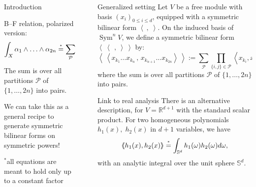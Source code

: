 \documentclass[final]{beamer}
\newlength{\sepwid}
\newlength{\onecolwid}
\DeclareMathOperator{\Sym}{Sym}
\newcommand{\coloneqq}{:=}
\newcommand{\bra}{\left<\!\!\!\:\left<}
\newcommand{\ket}{\right>\!\!\!\:\right>}
\newcommand{\myeq}[1]{\mathrel{\overset{\makebox[0pt]{\text{\tiny #1}}}{=}}}
\newcommand{\stareq}{\myeq{*}}
\newcommand{\R}{\mathbb{R}}
\renewcommand{\S}{\mathbb{S}}
\begin{document}
\begin{frame}[t]
\begin{columns}[t]
\begin{column}{\onecolwid}
\begin{block}{Introduction}
\begin{alertblock}{B--F relation, polarized version:}
$$
\int_X \alpha_1\wedge\ldots \wedge\alpha_{2n} \stareq\sum_{\mathcal{P}} \prod_{\{i,j\}\in\mathcal{P}} \left<\alpha_i,\alpha_j\right>.
$$
The sum is over all partitions $\mathcal{P}$ of $\{1,\ldots,2n\}$ into pairs.
\end{alertblock}
We can take this as a general recipe to generate symmetric bilinear forms on symmetric powers!
\vspace{55mm}
\begin{flushright}
${}^*$all equations are meant to hold only up to a constant factor
\end{flushright}
\end{block}






\end{column} %


\begin{column}{\sepwid}\end{column} %

\begin{column}{\onecolwid} %

\begin{block}{Generalized setting}
Let $V$ be a free module with basis $(x_i)_{0\leq i\leq d}$, equipped with a symmetric bilinear form $\left<\ ,\;\right>$.
On the induced basis of $\Sym^nV$, we define a symmetric bilinear form $\bra\ \,,\ \ket$ by: 
\begin{equation*}
\label{mydef}
\bra x_{k_1}\ldots x_{k_n}\,,\,x_{k_{n+1}}\ldots x_{k_{2n}} \ket \coloneqq \sum_{\mathcal{P}} \prod_{\{i,j\}\in\mathcal{P}} \left<x_{k_i},x_{k_j}\right>,
\end{equation*}
where the sum is over all partitions $\mathcal{P}$ of $\{1,\ldots,2n\}$ into pairs.
\end{block}

\begin{block}{Link to real analysis}
There is an alternative description, for $V=\R^{d+1}$ with the standard scalar product.
For two homogeneous polynomials $h_1(x),\;h_2(x)$ in $d+1$ variables, we have
$$
\bra h_1(x), h_2(x) \ket \stareq \int_{\S^d}  h_1(\omega) h_2(\omega) d\omega ,
$$ 
with an analytic integral over the unit sphere $\S^d$.


\end{block}
\end{column}
\end{columns}
\end{frame}
\end{document}
